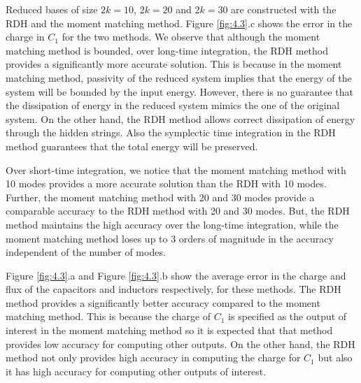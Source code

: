 Reduced bases of size $2k = 10$, $2k = 20$ and $2k = 30$ are constructed with the RDH and the moment matching method. Figure \ref{fig:4.3}.c shows the error in the charge in $C_1$ for the two methods. We observe that although the moment matching method is bounded, over long-time integration, the RDH method provides a significantly more accurate solution. This is because in the moment matching method, passivity of the reduced system implies that the energy of the system will be bounded by the input energy. However, there is no guarantee that the dissipation of energy in the reduced system mimics the one of the original system. On the other hand, the RDH method allows correct dissipation of energy through the hidden strings. Also the symplectic time integration in the RDH method guarantees that the total energy will be preserved.

Over short-time integration, we notice that the moment matching method with 10 modes provides a more accurate solution than the RDH with 10 modes. Further, the moment matching method with 20 and 30 modes provide a comparable accuracy to the RDH method with 20 and 30 modes. But, the RDH method maintains the high accuracy over the long-time integration, while the moment matching method loses up to 3 orders of magnitude in the accuracy independent of the number of modes.

Figure \ref{fig:4.3}.a and Figure \ref{fig:4.3}.b show the average error in the charge and flux of the capacitors and inductors respectively, for these methods. The RDH method provides a significantly better accuracy compared to the moment matching method. This is because the charge of $C_1$ is specified as the output of interest in the moment matching method so it is expected that that method provides low accuracy for computing other outputs. On the other hand, the RDH method not only provides high accuracy in computing the charge for $C_1$ but also it has high accuracy for computing other outputs of interest.

